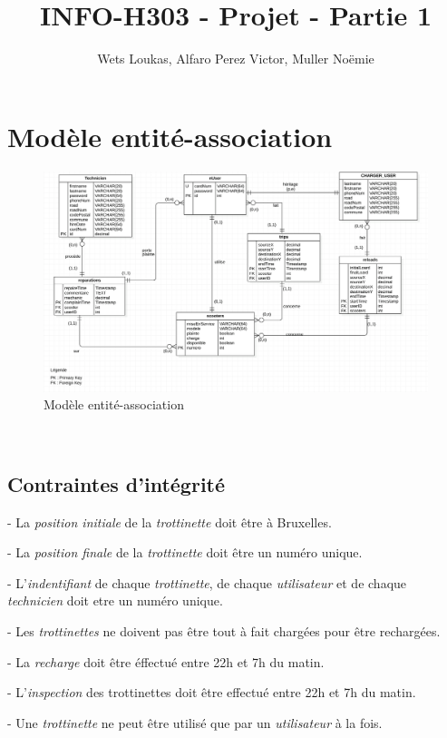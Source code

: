 \documentclass{article}
\title{INFO-H303 - Projet - Partie 1}
\author{Wets Loukas, Alfaro Perez Victor, Muller Noëmie}
\begin{document}
\maketitle

\renewcommand{\abstractname}{}


\section{Modèle entité-association}


\begin{figure}[hb]
\begin{center}
\includegraphics[scale=0.25]{image.png} 
\end{center}
\caption{Modèle entité-association}
\end{figure}
\
\subsection*{Contraintes d'intégrité}

- La \textit{position initiale} de la \textit{trottinette} doit être à Bruxelles.

- La \textit{position finale} de la \textit{trottinette} doit être un numéro unique.

- L'\textit{indentifiant} de chaque \textit{trottinette}, de chaque \textit{utilisateur} et de chaque \textit{technicien} doit etre un numéro unique.

- Les \textit{trottinettes} ne doivent pas être tout à fait chargées pour être rechargées.

- La \textit{recharge} doit être éffectué entre 22h et 7h du matin.

- L'\textit{inspection} des trottinettes doit être effectué entre 22h et 7h du matin.

- Une \textit{trottinette} ne peut être utilisé que par un \textit{utilisateur} à la fois.
\end{document}
